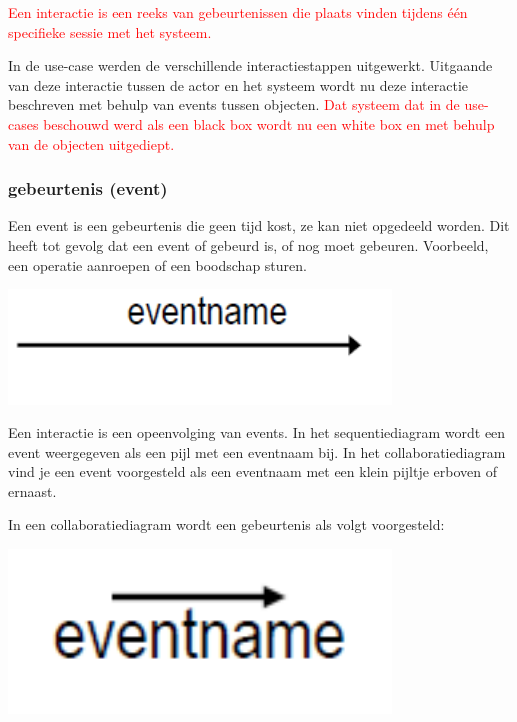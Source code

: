 \textcolor{red}{Een interactie is een reeks van gebeurtenissen die plaats vinden tijdens één specifieke sessie met het systeem.}

In de use-case werden de verschillende interactiestappen uitgewerkt. Uitgaande van deze interactie tussen de actor en het systeem wordt nu deze interactie beschreven met behulp van events tussen objecten. \textcolor{red}{Dat systeem dat in de use-cases beschouwd werd als een black box wordt nu een white box en met behulp van de objecten uitgediept.}

\subsubsection{ gebeurtenis (event)}
Een event is een gebeurtenis die geen tijd kost, ze kan niet opgedeeld worden. Dit heeft tot gevolg dat een event of gebeurd is, of nog moet gebeuren. Voorbeeld, een operatie aanroepen of een boodschap sturen.


\begin{center}
\includegraphics[width=4in]{img/event1}
\end{center}

Een interactie is een opeenvolging van events.
In het sequentiediagram wordt een event weergegeven als een pijl met een eventnaam bij. In het collaboratiediagram vind je een event voorgesteld als een eventnaam met een klein pijltje erboven of ernaast.

In een collaboratiediagram wordt een gebeurtenis als volgt voorgesteld:


\begin{center}
\includegraphics[width=4in]{img/event2}%
\end{center}

